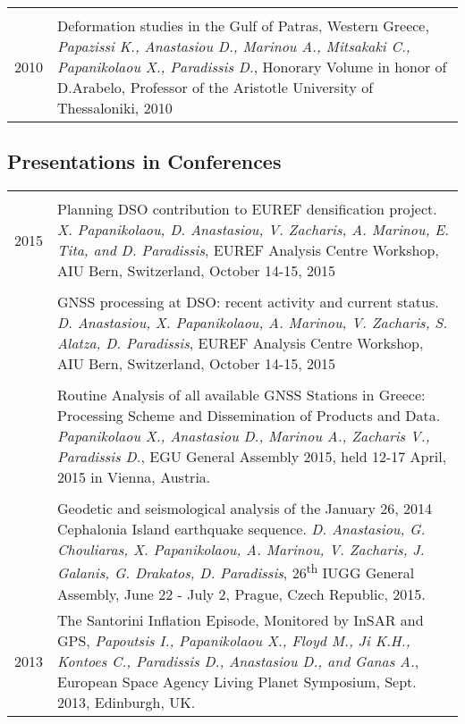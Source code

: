 \documentclass[a4paper,10pt]{article} %
\begin{document}
\begin{longtable}{r|p{14cm}}
\multicolumn{2}{c}{} \\ 
  \textsc{2010}
  & Deformation studies in the Gulf of Patras, Western Greece,
  \emph{Papazissi K., Anastasiou D., Marinou A., Mitsakaki C., Papanikolaou X., Paradissis D.}, 
  Honorary Volume in honor of D.Arabelo, Professor of the Aristotle University of Thessaloniki, 2010\\
\end{longtable}

\subsection*{Presentations in Conferences}

\begin{longtable}{r|p{14cm}}
\multicolumn{2}{c}{} \\ 
  \textsc{2015}

  & Planning DSO contribution to EUREF densification project.
  \emph{X. Papanikolaou, D. Anastasiou, V. Zacharis, A. Marinou, E. Tita, and D. Paradissis},
  EUREF Analysis Centre Workshop, AIU Bern, Switzerland, October 14-15, 2015\\

  &\\

  & GNSS processing at DSO: recent activity and current status.
  \emph{D. Anastasiou, X. Papanikolaou, A. Marinou, V. Zacharis, S. Alatza, D. Paradissis},
  EUREF Analysis Centre Workshop, AIU Bern, Switzerland, October 14-15, 2015\\

  &\\

  & Routine Analysis of all available GNSS Stations in Greece: Processing Scheme and Dissemination of Products and Data.
  \emph{Papanikolaou X., Anastasiou D., Marinou A., Zacharis V., Paradissis D.},
  EGU General Assembly 2015, held 12-17 April, 2015 in Vienna, Austria.\\

  &\\

  & Geodetic and seismological analysis of the January 26, 2014 Cephalonia Island earthquake sequence.
  \emph{D. Anastasiou, G. Chouliaras, X. Papanikolaou, A. Marinou, V. Zacharis, J. Galanis, G. Drakatos, D. Paradissis},
  26\textsuperscript{th} IUGG General Assembly, June 22 - July 2, Prague, Czech Republic, 2015.\\
  
  \textsc{2013}
  & The Santorini Inflation Episode, Monitored by InSAR and GPS,
  \emph{Papoutsis I., Papanikolaou X., Floyd M., Ji K.H., Kontoes C., Paradissis D., Anastasiou D., and Ganas A.},
  European Space Agency Living Planet Symposium, Sept. 2013, Edinburgh, UK.\\


\end{longtable}
\end{document}
